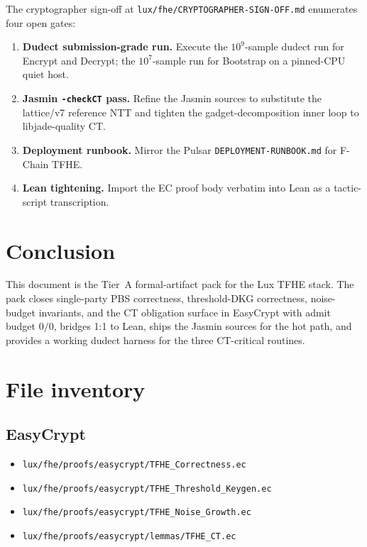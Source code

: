 \documentclass[11pt,a4paper]{article}
\begin{document}
The cryptographer sign-off at
\texttt{lux/fhe/CRYPTOGRAPHER-SIGN-OFF.md} enumerates four
open gates:

\begin{enumerate}
\item \textbf{Dudect submission-grade run.} Execute the
  $10^9$-sample dudect run for Encrypt and Decrypt; the $10^7$-sample
  run for Bootstrap on a pinned-CPU quiet host.
\item \textbf{Jasmin \texttt{-checkCT} pass.} Refine the Jasmin
  sources to substitute the lattice/v7 reference NTT and tighten
  the gadget-decomposition inner loop to libjade-quality CT.
\item \textbf{Deployment runbook.} Mirror the Pulsar
  \texttt{DEPLOYMENT-RUNBOOK.md} for F-Chain TFHE.
\item \textbf{Lean tightening.} Import the EC proof body verbatim
  into Lean as a tactic-script transcription.
\end{enumerate}

\section{Conclusion}

This document is the Tier~A formal-artifact pack for the Lux TFHE
stack. The pack closes single-party PBS correctness, threshold-DKG
correctness, noise-budget invariants, and the CT obligation
surface in EasyCrypt with admit budget $0/0$, bridges 1:1 to Lean,
ships the Jasmin sources for the hot path, and provides a working
dudect harness for the three CT-critical routines.

\appendix

\section{File inventory}

\subsection*{EasyCrypt}
\begin{itemize}
\item \texttt{lux/fhe/proofs/easycrypt/TFHE\_Correctness.ec}
\item \texttt{lux/fhe/proofs/easycrypt/TFHE\_Threshold\_Keygen.ec}
\item \texttt{lux/fhe/proofs/easycrypt/TFHE\_Noise\_Growth.ec}
\item \texttt{lux/fhe/proofs/easycrypt/lemmas/TFHE\_CT.ec}
\end{itemize}
\end{document}
